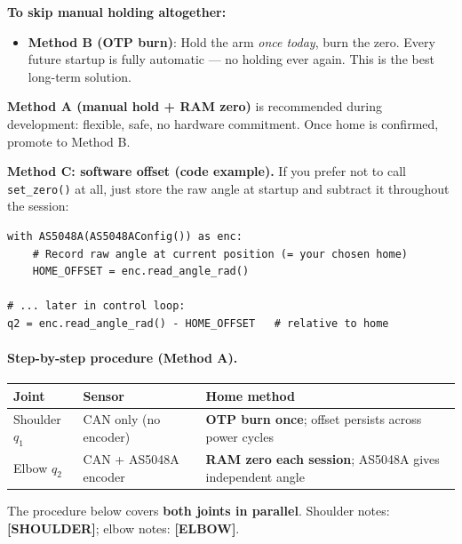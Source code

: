 \documentclass[11pt,a4paper]{article}
\begin{document}
\begin{tcolorbox}[colback=green!5, colframe=green!50!black, title=\textbf{Recommended method}]
  \textbf{To skip manual holding altogether:}
  \begin{itemize}[leftmargin=1.5em]
    \item \textbf{Method B (OTP burn)}: Hold the arm \emph{once today}, burn the zero.
          Every future startup is fully automatic --- no holding ever again.
          This is the best long-term solution.
  \end{itemize}
  \textbf{Method A (manual hold + RAM zero)} is recommended during development:
  flexible, safe, no hardware commitment. Once home is confirmed, promote to Method B.
\end{tcolorbox}

\medskip

\textbf{Method C: software offset (code example).}
If you prefer not to call \texttt{set\_zero()} at all, just store the raw angle at startup
and subtract it throughout the session:
\begin{lstlisting}[caption={Software offset: no encoder write needed.}]
with AS5048A(AS5048AConfig()) as enc:
    # Record raw angle at current position (= your chosen home)
    HOME_OFFSET = enc.read_angle_rad()

# ... later in control loop:
q2 = enc.read_angle_rad() - HOME_OFFSET   # relative to home
\end{lstlisting}

\paragraph{Step-by-step procedure (Method A).}

\begin{tcolorbox}[colback=gray!5, colframe=gray!50, title=\textbf{Two joints --- two different home strategies}]
\begin{tabularx}{\linewidth}{@{}lXX@{}}
\toprule
\textbf{Joint} & \textbf{Sensor} & \textbf{Home method} \\
\midrule
Shoulder $q_1$ & CAN only (no encoder) &
  \textbf{OTP burn once}; offset persists across power cycles \\
Elbow $q_2$ & CAN + AS5048A encoder &
  \textbf{RAM zero each session}; AS5048A gives independent angle \\
\bottomrule
\end{tabularx}

\smallskip
The procedure below covers \textbf{both joints in parallel}.
Shoulder notes: \textcolor{blue!70!black}{\textbf{[SHOULDER]}};
elbow notes: \textcolor{green!50!black}{\textbf{[ELBOW]}}.
\end{tcolorbox}
\end{document}

